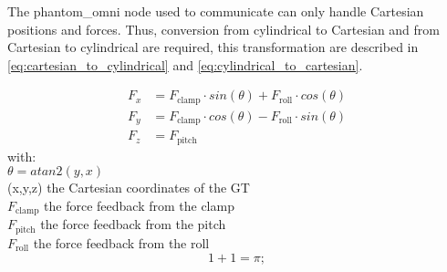 The phantom\_omni node\cite{phantom_omni_github} used to communicate can only handle Cartesian positions and forces. Thus, conversion from cylindrical to Cartesian and from Cartesian to cylindrical are required, this transformation are described in \eqref{eq:cartesian_to_cylindrical} and \eqref{eq:cylindrical_to_cartesian}.



\begin{equation} 
\begin{split}
	F_x &= F_\textrm{clamp}\cdot sin(\theta) + F_\textrm{roll}\cdot cos(\theta)\\
	F_y &= F_\textrm{clamp}\cdot cos(\theta) - F_\textrm{roll}\cdot sin(\theta)\\
	F_z &= F_\textrm{pitch}
	\end{split}
\label{eq:cylindrical_to_cartesian}
\end{equation}
with:\\
\hspace*{8mm} $\theta = atan2(y,x)$\\
\hspace*{8mm} (x,y,z)  the Cartesian coordinates of the GT\\
\hspace*{8mm} $F_\textrm{clamp}$  the force feedback from the clamp\\
\hspace*{8mm} $F_\textrm{pitch}$  the force feedback from the pitch\\
\hspace*{8mm} $F_\textrm{roll}$  the force feedback from the roll\\

\begin{equation} 
1+1=\pi;
\label{eq:cartesian_to_cylindrical}
\end{equation}

